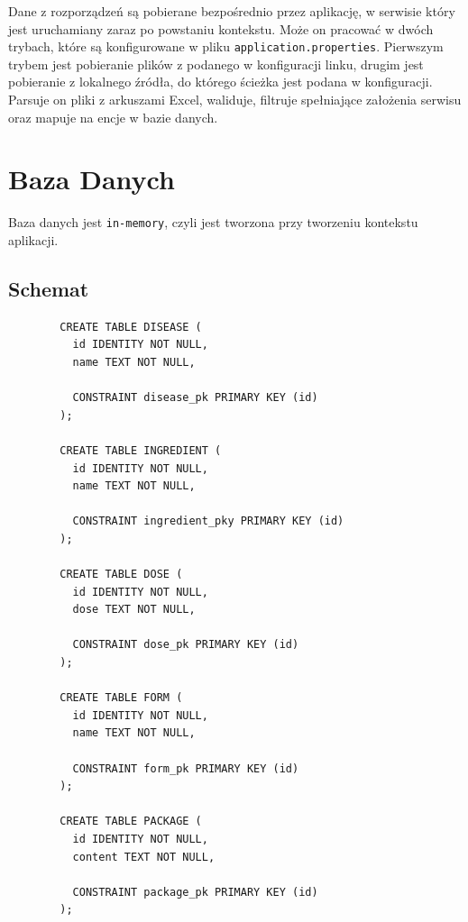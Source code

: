 \documentclass{article}
\begin{document}
    Dane z rozporządzeń są pobierane bezpośrednio przez aplikację, w serwisie który jest uruchamiany zaraz po powstaniu kontekstu.
    Może on pracować w dwóch trybach, które są konfigurowane w pliku \texttt{application.properties}.
    Pierwszym trybem jest pobieranie plików z podanego w konfiguracji linku,
    drugim jest pobieranie z lokalnego źródła, do którego ścieżka jest podana w konfiguracji.
    Parsuje on pliki z arkuszami Excel, waliduje, filtruje spełniające założenia serwisu oraz mapuje na encje w bazie danych.
  \section{Baza Danych}
  Baza danych jest \texttt{in-memory}, czyli jest tworzona przy tworzeniu kontekstu aplikacji.

  \subsection{Schemat}
    \noindent
    \begin{minipage}{.45\textwidth}
      \begin{lstlisting}
        CREATE TABLE DISEASE (
          id IDENTITY NOT NULL,
          name TEXT NOT NULL,

          CONSTRAINT disease_pk PRIMARY KEY (id)
        );

        CREATE TABLE INGREDIENT (
          id IDENTITY NOT NULL,
          name TEXT NOT NULL,

          CONSTRAINT ingredient_pky PRIMARY KEY (id)
        );

        CREATE TABLE DOSE (
          id IDENTITY NOT NULL,
          dose TEXT NOT NULL,

          CONSTRAINT dose_pk PRIMARY KEY (id)
        );

        CREATE TABLE FORM (
          id IDENTITY NOT NULL,
          name TEXT NOT NULL,

          CONSTRAINT form_pk PRIMARY KEY (id)
        );

        CREATE TABLE PACKAGE (
          id IDENTITY NOT NULL,
          content TEXT NOT NULL,

          CONSTRAINT package_pk PRIMARY KEY (id)
        );
      \end{lstlisting}
    \end{minipage}\hfill
\end{document}
